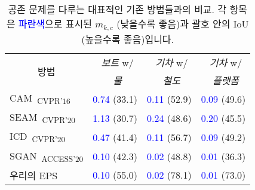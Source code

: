 
\newcommand{\R}{\textcolor{red}}
\newcommand{\B}{\textcolor{blue}}

\begin{table}[]
\centering
{\small
\begin{tabular}{@{}llll@{}}
\toprule
\multicolumn{1}{c}{\multirow{2}{*}{방법}} & \multicolumn{1}{c}{~\emph{보트} w/}   & \multicolumn{1}{c}{~\emph{기차} w/}  & \multicolumn{1}{c}{~\emph{기차} w/}  \\
& \multicolumn{1}{c}{~\emph{물}} & \multicolumn{1}{c}{~\emph{철도}}          & \multicolumn{1}{c}{~\emph{플랫폼}}  \\ \midrule
\multicolumn{1}{l}{CAM~\cite{zhou2016learning}\textsubscript{CVPR'16}}              & \B{0.74} (33.1)   & \B{0.11} (52.9)   & \multicolumn{1}{l}{\B{0.09} (49.6)}   \\
\multicolumn{1}{l}{SEAM~\cite{wang2020self}\textsubscript{CVPR'20}}                 & \B{1.13} (30.7)   & \B{0.24} (48.6)   & \multicolumn{1}{l}{\B{0.20} (45.5)}   \\
\multicolumn{1}{l}{ICD~\cite{fan2020learning}\textsubscript{CVPR'20}}               & \B{0.47} (41.4)   & \B{0.11} (56.7)   & \multicolumn{1}{l}{\B{0.09} (49.2)}   \\
\multicolumn{1}{l}{SGAN~\cite{yao2020saliency}\textsubscript{ACCESS'20}}            & \B{0.10} (42.3)   & \B{0.02} (48.8)   & \multicolumn{1}{l}{\B{0.01} (36.3)}   \\
\multicolumn{1}{l}{우리의 EPS}                                                         & \B{0.10} (55.0)   & \B{0.02} (78.1)   & \multicolumn{1}{l}{\B{0.01} (73.0)}   \\ \bottomrule
\end{tabular}
}
\vspace{2mm}
\caption{공존 문제를 다루는 대표적인 기존 방법들과의 비교. 각 항목은 \B{파란색}으로 표시된 {$m_{k,c}$} (낮을수록 좋음)과 괄호 안의 IoU (높을수록 좋음)입니다.} \vspace{-2mm}
\label{tab:co_quantitative_v4}

\end{table}
